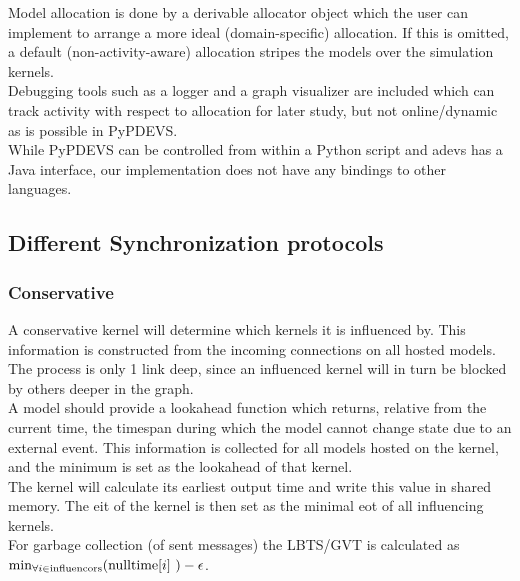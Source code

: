 Model allocation is done by a derivable allocator object which the user can implement to arrange a more ideal (domain-specific) allocation. If this is omitted, a default (non-activity-aware) allocation stripes the models over the simulation kernels.\\
Debugging tools such as a logger and a graph visualizer are included which can track activity with respect to allocation for later study, but not online/dynamic as is possible in PyPDEVS.\\
While PyPDEVS can be controlled from within a Python script and adevs has a Java interface, our implementation does not have any bindings to other languages.

\subsection{Different Synchronization protocols}
\subsubsection{Conservative}
A conservative kernel will determine which kernels it is influenced by. This information is constructed from the incoming connections on all hosted models. The process is only 1 link deep, since an influenced kernel will in turn be blocked by others deeper in the graph.\\
A model should provide a lookahead function which returns, relative from the current time, the timespan during which the model cannot change state due to an external event. This information is collected for all models hosted on the kernel, and the minimum is set as the lookahead of that kernel. \\
The kernel will calculate its earliest output time and write this value in shared memory. The eit of the kernel is then set as the minimal eot of all influencing kernels. \\
For garbage collection (of sent messages) the LBTS/GVT is calculated as $\min_{\forall i \in \textup{influencors}}( \textup{nulltime}[i]\ )  - \epsilon $. %

